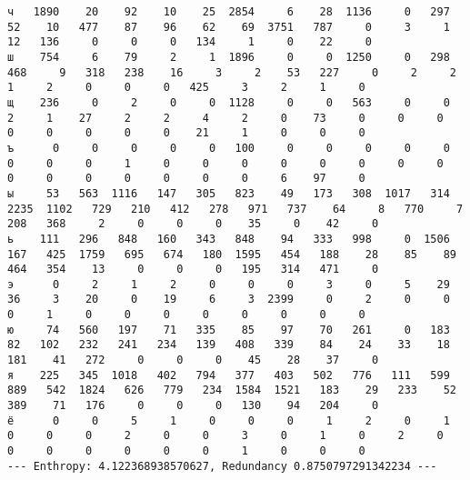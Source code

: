 \documentclass{article}
\begin{document}
\begin{landscape}
\begin{addmargin}{0em}
\begin{verbatim}
ч   1890    20    92    10    25  2854     6    28  1136     0   297    52    10   477    87    96    62    69  3751   787     0     3     1    12   136     0     0     0   134     1     0    22     0
ш    754     6    79     2     1  1896     0     0  1250     0   298   468     9   318   238    16     3     2    53   227     0     2     2     1     2     0     0     0   425     3     2     1     0
щ    236     0     2     0     0  1128     0     0   563     0     0     2     1    27     2     2     4     2     0    73     0     0     0     0     0     0     0     0    21     1     0     0     0
ъ      0     0     0     0     0   100     0     0     0     0     0     0     0     0     1     0     0     0     0     0     0     0     0     0     0     0     0     0     0     0     6    97     0
ы     53   563  1116   147   305   823    49   173   308  1017   314  2235  1102   729   210   412   278   971   737    64     8   770     7   208   368     2     0     0     0    35     0    42     0
ь    111   296   848   160   343   848    94   333   998     0  1506   167   425  1759   695   674   180  1595   454   188    28    85    89   464   354    13     0     0     0   195   314   471     0
э      0     2     1     2     0     0     0     3     0     5    29    36     3    20     0    19     6     3  2399     0     2     0     0     0     1     0     0     0     0     0     0     0     0
ю     74   560   197    71   335    85    97    70   261     0   183    82   102   232   241   234   139   408   339    84    24    33    18   181    41   272     0     0     0    45    28    37     0
я    225   345  1018   402   794   377   403   502   776   111   599   889   542  1824   626   779   234  1584  1521   183    29   233    52   389    71   176     0     0     0   130    94   204     0
ё      0     0     5     1     0     0     0     1     2     0     1     0     0     0     2     0     0     3     0     1     0     2     0     0     0     0     0     0     0     1     0     0     0
--- Enthropy: 4.122368938570627, Redundancy 0.8750797291342234 ---
		\end{verbatim}
	\end{addmargin}
	
\end{landscape}
\end{document}
